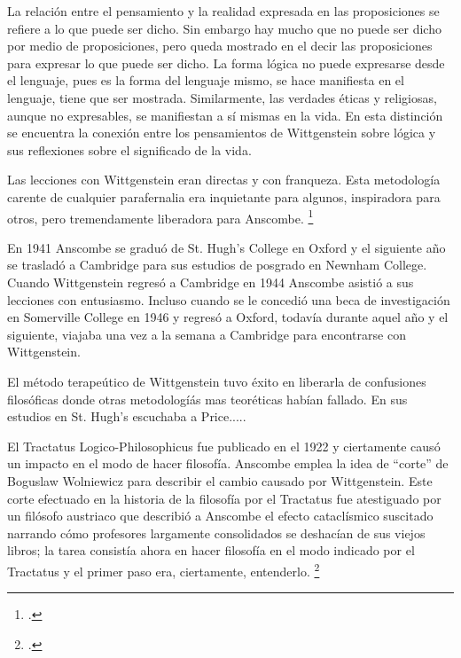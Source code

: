 La relación entre el pensamiento
y la realidad expresada en las proposiciones se refiere a lo que puede ser
dicho. Sin embargo hay mucho que no puede ser dicho por medio de proposiciones,
pero queda mostrado en el decir las proposiciones para expresar lo que puede ser
dicho. La forma lógica no puede expresarse desde el lenguaje, pues es la forma
del lenguaje mismo, se hace manifiesta en el lenguaje, tiene que ser mostrada.
Similarmente, las verdades éticas y religiosas, aunque no expresables, se
manifiestan a sí mismas en la vida. En esta distinción se encuentra la conexión
entre los pensamientos de Wittgenstein sobre lógica y sus reflexiones sobre el
significado de la vida.

Las lecciones con Wittgenstein eran directas y con franqueza. Esta metodología
carente de cualquier parafernalia era inquietante para algunos, inspiradora para
otros, pero tremendamente liberadora para Anscombe. \footcite[loc 9853 Chapter
4, Section 24, para. 5]{monk}

En 1941 Anscombe se graduó de St. Hugh's College en Oxford y el siguiente año se
trasladó a Cambridge para sus estudios de posgrado en Newnham College. Cuando
Wittgenstein regresó a Cambridge en 1944 Anscombe asistió a sus lecciones con
entusiasmo. Incluso cuando se le concedió una beca de investigación en
Somerville College en 1946 y regresó a Oxford, todavía durante aquel año y el
siguiente, viajaba una vez a la semana a Cambridge para encontrarse con
Wittgenstein.  

El método terapeútico de Wittgenstein tuvo éxito en liberarla de confusiones
filosóficas donde otras metodologíás mas teoréticas habían fallado. En sus
estudios en St. Hugh's escuchaba a Price.....




El Tractatus Logico-Philosophicus fue publicado en el 1922 y ciertamente causó
un impacto en el modo de hacer filosofía. Anscombe emplea la idea de ``corte''
de Boguslaw Wolniewicz para describir el cambio causado por Wittgenstein. Este
corte efectuado en la historia de la filosofía por el Tractatus fue atestiguado
por un filósofo austriaco que describió a Anscombe el efecto cataclísmico
suscitado narrando cómo profesores largamente consolidados se deshacían de sus
viejos libros; la tarea consistía ahora en hacer filosofía en el modo indicado
por el Tractatus y el primer paso era, ciertamente, entenderlo.
\footcite[p.181]{twocuts} 


